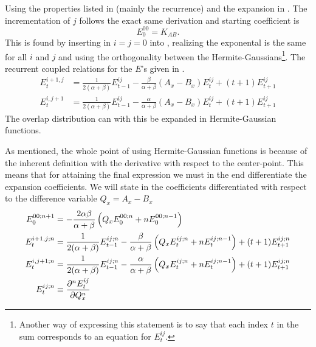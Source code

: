     Using the properties listed in  (mainly the
    recurrence) and the expansion in . The incrementation of
    $j$ follows the exact same derivation and starting coefficient is
        \begin{equation}
            E^{00}_0 = K_{AB}.
        \end{equation}
    This is found by inserting in $i=j=0$ into , realizing
    the exponental is the same for all $i$ and $j$ and using the orthogonality
    between the Hermite-Gaussians\footnote{Another way of expressing this
    statement is to say that each index $t$ in the sum corresponds to an
    equation for $E^{ij}_t$.}. The recurrent coupled relations for the
    $E$'s given in .
        \begin{equation}
            \begin{aligned}
                E^{i+1,j}_t &= \frac{1}{2(\alpha + \beta)}E^{ij}_{t-1} -
                \frac{\beta}{\alpha+\beta}(A_x - B_x)E^{ij}_t +
                (t+1)E^{ij}_{t+1} \\
                E^{i,j+1}_t &= \frac{1}{2(\alpha + \beta)}E^{ij}_{t-1} -
                \frac{\alpha}{\alpha+\beta}(A_x - B_x)E^{ij}_t +
                (t+1)E^{ij}_{t+1}
            \end{aligned}
            \label{eq:coupledreccoeff}
        \end{equation}
    The overlap distribution can with this be expanded in Hermite-Gaussian
    functions.

    As mentioned, the whole point of using Hermite-Gaussian functions is
    because of the inherent definition with the derivative with respect to the
    center-point. This means that for attaining the final expression we must in
    the end differentiate the expansion coefficients. We will state in
     the coefficients differentiated with respect to the
    difference variable $Q_x=A_x-B_x$ 
        \begin{equation}
            \begin{aligned}
                E^{00;n+1}_0 &=
                -\frac{2\alpha\beta}{\alpha+\beta}\left(Q_xE^{00;n}_0 +
                nE^{00;n-1}_0\right) \\
                E^{i+1,j;n}_t &= \frac{1}{2(\alpha+\beta)}E^{ij;n}_{t-1} -
                \frac{\beta}{\alpha+\beta}\left(Q_xE^{ij;n}_t +
                nE^{ij;n-1}_t\right) + (t+1)E^{ij;n}_{t+1} \\
                E^{i,j+1;n}_t &= \frac{1}{2(\alpha+\beta)}E^{ij;n}_{t-1} -
                \frac{\alpha}{\alpha+\beta}\left(Q_xE^{ij;n}_t +
                nE^{ij;n-1}_t\right) + (t+1)E^{ij;n}_{t+1} \\
                E^{ij;n}_t &\equiv \frac{\mathrm{\partial}^n E^{ij}_t}{\mathrm{\partial} Q^n_x}
            \end{aligned}
            \label{eq:coeffdiffdef}
        \end{equation}

